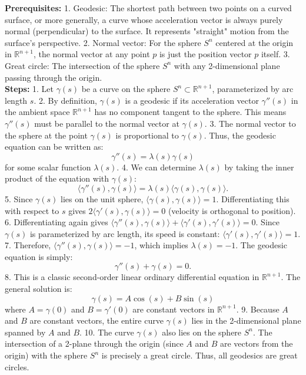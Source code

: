 \begin{solution}
\textbf{Prerequisites:}
1. Geodesic: The shortest path between two points on a curved surface, or more generally, a curve whose acceleration vector is always purely normal (perpendicular) to the surface. It represents "straight" motion from the surface's perspective.
2. Normal vector: For the sphere $S^n$ centered at the origin in $\mathbb{R}^{n+1}$, the normal vector at any point $p$ is just the position vector $p$ itself.
3. Great circle: The intersection of the sphere $S^n$ with any 2-dimensional plane passing through the origin.\\[2ex]

\textbf{Steps:}
1. Let $\gamma(s)$ be a curve on the sphere $S^n \subset \mathbb{R}^{n+1}$, parameterized by arc length $s$.
2. By definition, $\gamma(s)$ is a geodesic if its acceleration vector $\gamma''(s)$ in the ambient space $\mathbb{R}^{n+1}$ has no component tangent to the sphere. This means $\gamma''(s)$ must be parallel to the normal vector at $\gamma(s)$.
3. The normal vector to the sphere at the point $\gamma(s)$ is proportional to $\gamma(s)$. Thus, the geodesic equation can be written as:
   \[ \gamma''(s) = \lambda(s) \gamma(s) \]
   for some scalar function $\lambda(s)$.
4. We can determine $\lambda(s)$ by taking the inner product of the equation with $\gamma(s)$:
   \[ \langle \gamma''(s), \gamma(s) \rangle = \lambda(s) \langle \gamma(s), \gamma(s) \rangle. \]
5. Since $\gamma(s)$ lies on the unit sphere, $\langle \gamma(s), \gamma(s) \rangle = 1$. Differentiating this with respect to $s$ gives $2\langle \gamma'(s), \gamma(s) \rangle = 0$ (velocity is orthogonal to position).
6. Differentiating again gives $\langle \gamma''(s), \gamma(s) \rangle + \langle \gamma'(s), \gamma'(s) \rangle = 0$. Since $\gamma(s)$ is parameterized by arc length, its speed is constant: $\langle \gamma'(s), \gamma'(s) \rangle = 1$.
7. Therefore, $\langle \gamma''(s), \gamma(s) \rangle = -1$, which implies $\lambda(s) = -1$. The geodesic equation is simply:
   \[ \gamma''(s) + \gamma(s) = 0. \]
8. This is a classic second-order linear ordinary differential equation in $\mathbb{R}^{n+1}$. The general solution is:
   \[ \gamma(s) = A \cos(s) + B \sin(s) \]
   where $A = \gamma(0)$ and $B = \gamma'(0)$ are constant vectors in $\mathbb{R}^{n+1}$.
9. Because $A$ and $B$ are constant vectors, the entire curve $\gamma(s)$ lies in the 2-dimensional plane spanned by $A$ and $B$.
10. The curve $\gamma(s)$ also lies on the sphere $S^n$. The intersection of a 2-plane through the origin (since $A$ and $B$ are vectors from the origin) with the sphere $S^n$ is precisely a great circle. Thus, all geodesics are great circles.\\[2ex]


\end{solution}
